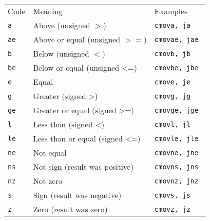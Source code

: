 \vspace{0.2in}
\begin{tabular}{l|l|l}
  Code & Meaning & Examples \\
\tt a & Above (unsigned $>$) & \tt cmova, ja \\
\tt ae & Above or equal (unsigned $>=$) & \tt cmovae, jae  \\
\tt b & Below (unsigned $<$) & \tt cmovb, jb \\ 
\tt be & Below or equal (unsigned <=) & \tt  cmovbe, jbe \\ 
\tt e & Equal  & \tt cmove, je \\
\tt g &   Greater (signed >)  & \tt  cmovg, jg \\
\tt  ge & Greater or equal (signed >=)  & \tt  cmovge, jge \\
\tt l & Less than (signed <)  & \tt  cmovl, jl  \\
\tt le & Less than or equal (signed <=)  & \tt  cmovle, jle  \\
\tt ne & Not equal  & \tt  cmovne, jne  \\
\tt ns & Not sign (result was positive)  & \tt  cmovns, jns \\
\tt nz & Not zero  & \tt  cmovnz, jnz  \\
\tt s & Sign (result was negative)  & \tt  cmovs, js \\
\tt z & Zero (result was zero) & \tt  cmovz, jz \\
\end{tabular}


